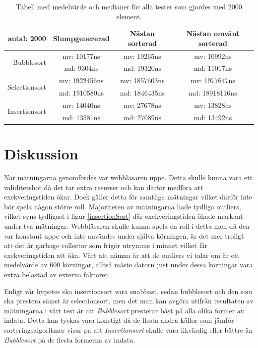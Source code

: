 \documentclass[a4paper]{article}
\begin{document}
\begin{table}[H]
	\begin{tabular}{r|c|c|c|}
		antal: 2000 & Slumpgenererad & Nästan sorterad & Nästan omvänt sorterad \\ \hline
		\multirow{2}{*}{Bubblesort}    & mv: 10177ns & mv: 19265ns & mv: 10992ns \\
		                               & md: 9304ns & md: 19320ns & md: 11017ns \\ \hline
		\multirow{2}{*}{Selectionsort} & mv: 1922456ns & mv: 1857603ns & mv: 1977647ns \\
		                               & md: 1910580ns & md: 1846435ns & md: 18918116ns \\ \hline
		\multirow{2}{*}{Insertionsort} & mv: 14040ns & mv: 27678ns & mv: 13828ns \\
		                               & md: 13581ns & md: 27089ns & md: 13492ns \\ \hline	
	\end{tabular}
	\caption{Tabell med medelvärde och medianer för alla tester som gjordes med 2000 element.}
	\label{Tabel2000}
\end{table}

\section{Diskussion}
När mätningarna genomfördes var webbläsaren uppe. Detta skulle kunna vara ett validitetshot då det tar extra resurser och kan därför medföra att exekveringstiden ökar. Dock gäller detta för samtliga mätningar vilket därför inte bör spela någon större roll. Majoriteten av mätningarna hade tydliga outliers, vilket syns tydligast i figur \ref{insertionSort} där exekveringstiden ökade markant under två mätningar. Webbläsaren skulle kunna spela en roll i detta men då den var konstant uppe och inte användes under själva körningen, är det mer troligt att det är garbage collector som frigör utrymme i minnet vilket får exekveringstiden att öka. Värt att nämna är att de outliers vi talar om är ett medelvärde av 600 körningar, alltså måste datorn just under dessa körningar vara extra belastad av externa faktorer.

Enligt vår hypotes ska insertionsort vara snabbast, sedan bubblesort och den som ska prestera sämst är selectionsort, men det man kan avgöra utifrån resultaten av mätningarna i vårt test är att \emph{Bubblesort} presterar bäst på alla olika former av indata. Detta kan tyckas vara konstigt då de flesta andra källor som jämför sorteringsalgoritmer visar på att \emph{Insertionsort} skulle vara likvärdig eller bättre än \emph{Bubblesort} på de flesta formerna av indata.
\end{document}
